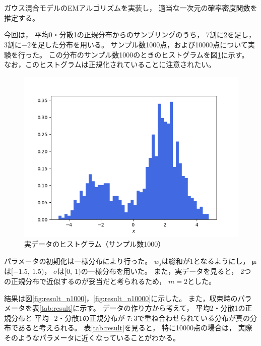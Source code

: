 \documentclass[class=jsarticle, crop=false, dvipdfmx, fleqn]{standalone}
\begin{document}
\section{}

ガウス混合モデルのEMアルゴリズムを実装し，
適当な一次元の確率密度関数を推定する。

今回は，
平均0・分散1の正規分布からのサンプリングのうち，
7割に2を足し，3割に\(-2\)を足した分布を用いる。
サンプル数\num{1000}点，および\num{10000}点について実験を行った。
この分布のサンプル数\num{1000}のときのヒストグラムを図\ref{fig:sample_hist}に示す。
なお，このヒストグラムは正規化されていることに注意されたい。

\begin{figure}[H]
    \centering
    \includegraphics[clip, width=12cm]{../figures/assignment2_sample}
    \caption{実データのヒストグラム（サンプル数\num{1000}）}
    \label{fig:sample_hist}
\end{figure}

パラメータの初期化は一様分布により行った。
\(w_j\)は総和が1となるようにし，
\(\bm{\mu}\)は\([-1.5,\ 1.5)\)，
\(\sigma\)は\([0,\ 1)\)の一様分布を用いた。
また，実データを見ると，
2つの正規分布で近似するのが妥当だと考られるため，
\(m = 2\)とした。

結果は図\ref{fig:result_n1000}，\ref{fig:result_n10000}に示した。
また，収束時のパラメータを表\ref{tab:result}に示す。
データの作り方から考えて，
平均2・分散1の正規分布と
平均\(-2\)・分散1の正規分布が
\(7:3\)で重ね合わせられている分布が真の分布であると考えられる。
表\ref{tab:result}を見ると，
特に\num{10000}点の場合は，
実際そのようなパラメータに近くなっていることがわかる。
\end{document}
